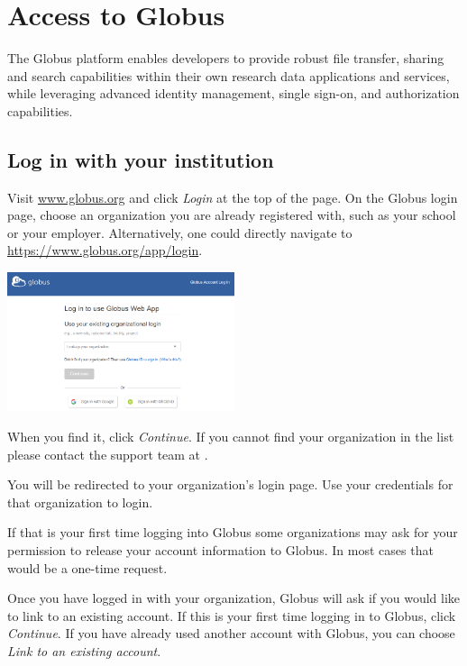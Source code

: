 \chapter{Access to Globus}

The Globus platform enables developers to provide robust file transfer,
 sharing and search capabilities within their own research data 
applications and services, while leveraging advanced identity management, 
single sign-on, and authorization capabilities.

\section{Log in with your institution}\label{login}

Visit \href{https://www.globus.org}{www.globus.org} and click \emph{Login} 
at the top of the page. On the Globus login page, choose an organization
 you are already registered with, such as your school or your employer.
Alternatively, one could directly navigate to 
\href{https://www.globus.org/app/login}{https://www.globus.org/app/login}.

\begin{center}
\includegraphics[width=0.5\textwidth]{img/access-login-screen.png}
\end{center}

When you find it, click \emph{Continue}. If you cannot find your 
organization in the list please contact the support team at 
\globusinfo.

You will be redirected to your organization's login page. 
Use your credentials for that organization to login.

If that is your first time logging into Globus 
some organizations may ask for your permission to 
release your account information to Globus. In most cases 
that would be a one-time request.

Once you have logged in with your organization, Globus will 
ask if you would like to link to an existing account. If this 
is your first time logging in to Globus, click \emph{Continue}. 
If you have already used another account with Globus, you can 
choose \emph{Link to an existing account}.

